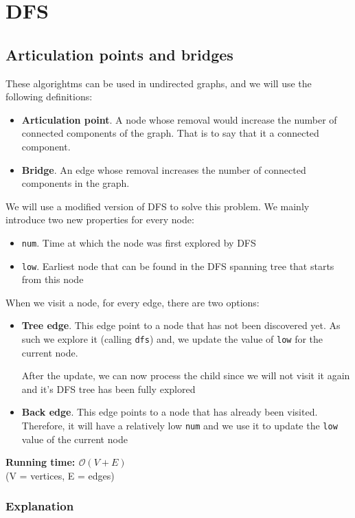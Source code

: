 \documentclass[12pt]{report}
\begin{document}
\section{DFS}
\subsection{Articulation points and bridges}
These algorightms can be used in undirected graphs, and we
will use the following definitions:
\begin{itemize}
	\def\itemsep{0 pt}
	\item \textbf{Articulation point}. A node whose removal would increase the number
		of connected components of the graph. That  is to say
		that it  a connected component.
	\item \textbf{Bridge}. An edge whose removal increases the number of 
		connected components in the graph.
\end{itemize}
We will use a modified version of DFS to solve this problem. We mainly introduce two new
properties for every node:
\begin{itemize}
	\def\itemsep{0 pt}
	\item \texttt{num}. Time at which the node was first explored by DFS
	\item \texttt{low}. Earliest node that can be found in the DFS spanning 
		tree that starts from this node
\end{itemize}
When we visit a node, for every edge, there are two options:
\begin{itemize}
\def \itemsep{0pt}
	\item \textbf{Tree edge}. This edge point to a node that has not been 
		discovered yet. As such we explore it (calling \texttt{dfs})
		and, we update the value of \texttt{low} for the current
		node. 

		After the update, we can now process the child since we will
		not visit it again and it's DFS tree has been fully explored

	\item \textbf{Back edge}. This edge points to a node that has already
		been visited. Therefore, it will have a relatively low 
		\texttt{num} and we use it to update the \texttt{low}
		value of the current node
\end{itemize}
\newpage
{}
\noindent \textbf{\boldmath Running time: $\mathcal{O}(V+E)$}
\\ {\small (V = vertices, E = edges)}
\subsubsection*{Explanation}
\end{document}
